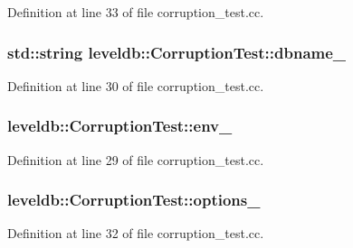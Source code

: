 Definition at line 33 of file corruption\+\_\+test.\+cc.

\hypertarget{classleveldb_1_1_corruption_test_a533997a5fb977df165da8d92b6e9914a}{}
\subsubsection[{dbname\+\_\+}]{\setlength{\rightskip}{0pt plus 5cm}std\+::string leveldb\+::\+Corruption\+Test\+::dbname\+\_\+}\label{classleveldb_1_1_corruption_test_a533997a5fb977df165da8d92b6e9914a}


Definition at line 30 of file corruption\+\_\+test.\+cc.

\hypertarget{classleveldb_1_1_corruption_test_a9ea05b88e4240ace348f542b43d59281}{}
\subsubsection[{env\+\_\+}]{ leveldb\+::\+Corruption\+Test\+::env\+\_\+}\label{classleveldb_1_1_corruption_test_a9ea05b88e4240ace348f542b43d59281}


Definition at line 29 of file corruption\+\_\+test.\+cc.

\hypertarget{classleveldb_1_1_corruption_test_a6d639ef3ec7f1009447b85f9a10f90ac}{}
\subsubsection[{options\+\_\+}]{ leveldb\+::\+Corruption\+Test\+::options\+\_\+}\label{classleveldb_1_1_corruption_test_a6d639ef3ec7f1009447b85f9a10f90ac}


Definition at line 32 of file corruption\+\_\+test.\+cc.

\hypertarget{classleveldb_1_1_corruption_test_afc8ff2f272ee3da2756acc21c37750d5}{}

